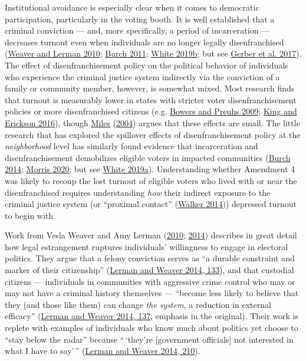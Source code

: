 \documentclass[
  12pt,
]{article}
\begin{document}
Institutional avoidance is especially clear when it comes to democratic participation, particularly in the voting booth. It is well established that a criminal conviction --- and, more specifically, a period of incarceration --- decreases turnout even when individuals are no longer legally disenfranchised (\protect\hyperlink{ref-Weaver2010}{Weaver and Lerman 2010}; \protect\hyperlink{ref-Burch2011}{Burch 2011}; \protect\hyperlink{ref-White2019}{White 2019b}; but see \protect\hyperlink{ref-Gerber2017}{Gerber et al. 2017}). The effect of disenfranchisement policy on the political behavior of individuals who experience the criminal justice system indirectly via the conviction of a family or community member, however, is somewhat mixed. Most research finds that turnout is measurably lower in states with stricter voter disenfranchisement policies or more disenfranchised citizens (e.g. \protect\hyperlink{ref-Bowers2009}{Bowers and Preuhs 2009}; \protect\hyperlink{ref-King2016}{King and Erickson 2016}), though \protect\hyperlink{ref-Miles2004}{Miles} (\protect\hyperlink{ref-Miles2004}{2004}) argues that these effects are small. The little research that has explored the spillover effects of disenfranchisement policy at the \emph{neighborhood} level has similarly found evidence that incarceration and disenfranchisement demobilizes eligible voters in impacted communities (\protect\hyperlink{ref-Burch2014}{Burch 2014}; \protect\hyperlink{ref-Morris2020}{Morris 2020}; but see \protect\hyperlink{ref-White2019a}{White 2019a}). Understanding whether Amendment 4 was likely to recoup the lost turnout of eligible voters who lived with or near the disenfranchised requires understanding \emph{how} their indirect exposure to the criminal justice system (or ``proximal contact'' (\protect\hyperlink{ref-Walker2014}{Walker 2014})) depressed turnout to begin with.

Work from Vesla Weaver and Amy Lerman (\protect\hyperlink{ref-Weaver2010}{2010}; \protect\hyperlink{ref-Lerman2014}{2014}) describes in great detail how legal estrangement ruptures individuals' willingness to engage in electoral politics. They argue that a felony conviction serves as ``a durable constraint and marker of their citizenship'' (\protect\hyperlink{ref-Lerman2014}{Lerman and Weaver 2014, 133}), and that custodial citizens --- individuals in communities with aggressive crime control who may or may not have a criminal history themselves --- ``become less likely to believe that they (and those like them) can change \emph{the system}, a reduction in external efficacy'' (\protect\hyperlink{ref-Lerman2014}{Lerman and Weaver 2014, 137}, emphasis in the original). Their work is replete with examples of individuals who know much about politics yet choose to ``stay below the radar'' because ``\,`they're {[}government officials{]} not interested in what I have to say'\,'' (\protect\hyperlink{ref-Lerman2014}{Lerman and Weaver 2014, 210}).
\end{document}
